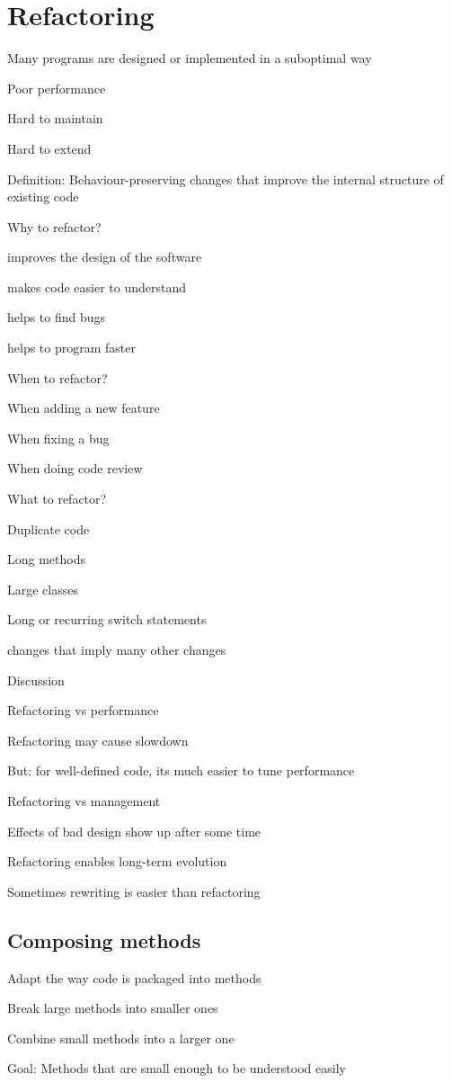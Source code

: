 \section{Refactoring}
\enumstart
	\item Many programs are designed or implemented in a suboptimal way
	\enumstart
		\item Poor performance
		\item Hard to maintain
		\item Hard to extend
	\enumend
	\item Definition: Behaviour-preserving changes that improve the internal structure of existing code
	\item Why to refactor?
	\enumstart
		\item improves the design of the software
		\item makes code easier to understand
		\item helps to find bugs
		\item helps to program faster
	\enumend
	\item When to refactor?
	\enumstart
		\item When adding a new feature
		\item When fixing a bug
		\item When doing code review
	\enumend
	\item What to refactor?
	\enumstart
		\item Duplicate code
		\item Long methods
		\item Large classes
		\item Long or recurring switch statements
		\item changes that imply many other changes
	\enumend
	\item Discussion
	\enumstart
		\item Refactoring vs performance
		\enumstart
			\item Refactoring may cause slowdown
			\item But: for well-defined code, its much easier to tune performance
		\enumend
		\item Refactoring vs management
		\enumstart
			\item Effects of bad design show up after some time
			\item Refactoring enables long-term evolution
		\enumend
		\item Sometimes rewriting is easier than refactoring
	\enumend
\enumend

\subsection{Composing methods}
\enumstart
	\item Adapt the way code is packaged into methods
	\item Break large methods into smaller ones
	\item Combine small methods into a larger one
	\item Goal: Methods that are small enough to be understood easily
\enumend

